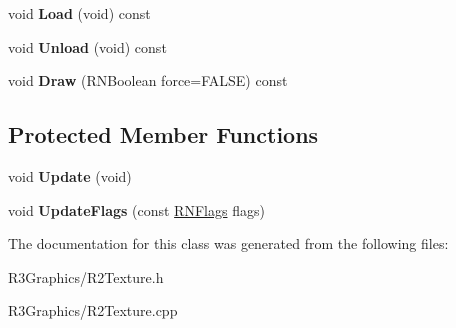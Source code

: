\begin{DoxyCompactItemize}
\item 
void {\bfseries Load} (void) const \hypertarget{class_r2_texture_a6f253a9604eb6241f560e325826cb90f}{}\label{class_r2_texture_a6f253a9604eb6241f560e325826cb90f}

\item 
void {\bfseries Unload} (void) const \hypertarget{class_r2_texture_aeff5b175732a5cd05c49e4438deab688}{}\label{class_r2_texture_aeff5b175732a5cd05c49e4438deab688}

\item 
void {\bfseries Draw} (R\+N\+Boolean force=F\+A\+L\+SE) const \hypertarget{class_r2_texture_a2da983c68a5bca30e69b10849b784270}{}\label{class_r2_texture_a2da983c68a5bca30e69b10849b784270}

\end{DoxyCompactItemize}
\subsection*{Protected Member Functions}
\begin{DoxyCompactItemize}
\item 
void {\bfseries Update} (void)\hypertarget{class_r2_texture_adae649e592b44388a09c4a4820fccac9}{}\label{class_r2_texture_adae649e592b44388a09c4a4820fccac9}

\item 
void {\bfseries Update\+Flags} (const \hyperlink{class_r_n_flags}{R\+N\+Flags} flags)\hypertarget{class_r2_texture_a65b5cdb0d3cc51bb7aef7bfd0a1b4315}{}\label{class_r2_texture_a65b5cdb0d3cc51bb7aef7bfd0a1b4315}

\end{DoxyCompactItemize}


The documentation for this class was generated from the following files\+:\begin{DoxyCompactItemize}
\item 
R3\+Graphics/R2\+Texture.\+h\item 
R3\+Graphics/R2\+Texture.\+cpp\end{DoxyCompactItemize}
